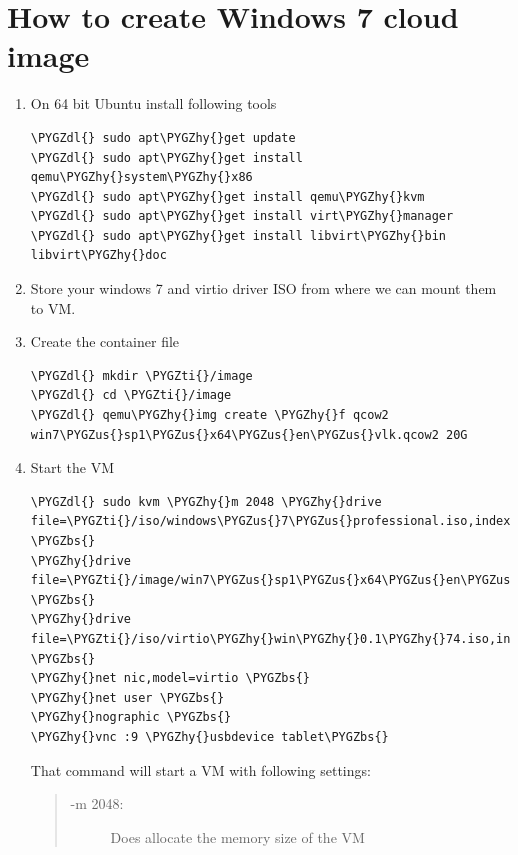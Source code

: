 \documentclass[letterpaper,10pt,english]{sphinxmanual}
\def\PYGZbs{\char`\\}
\def\PYGZus{\char`\_}
\def\PYGZdl{\char`\$}
\def\PYGZhy{\char`\-}
\def\PYGZti{\char`\~}
\begin{document}
\section{How to create Windows 7 cloud image}
\label{_source/admin_guide/windows7_image::doc}\label{_source/admin_guide/windows7_image:how-to-create-windows-7-cloud-image}\begin{enumerate}
\item {} 
On 64 bit Ubuntu install following tools

\begin{Verbatim}[commandchars=\\\{\}]
\PYGZdl{} sudo apt\PYGZhy{}get update
\PYGZdl{} sudo apt\PYGZhy{}get install qemu\PYGZhy{}system\PYGZhy{}x86
\PYGZdl{} sudo apt\PYGZhy{}get install qemu\PYGZhy{}kvm
\PYGZdl{} sudo apt\PYGZhy{}get install virt\PYGZhy{}manager
\PYGZdl{} sudo apt\PYGZhy{}get install libvirt\PYGZhy{}bin libvirt\PYGZhy{}doc
\end{Verbatim}

\item {} 
Store your windows 7 and virtio driver ISO from where we can mount them to VM.

\item {} 
Create the container file

\begin{Verbatim}[commandchars=\\\{\}]
\PYGZdl{} mkdir \PYGZti{}/image
\PYGZdl{} cd \PYGZti{}/image
\PYGZdl{} qemu\PYGZhy{}img create \PYGZhy{}f qcow2 win7\PYGZus{}sp1\PYGZus{}x64\PYGZus{}en\PYGZus{}vlk.qcow2 20G
\end{Verbatim}

\item {} 
Start the VM

\begin{Verbatim}[commandchars=\\\{\}]
\PYGZdl{} sudo kvm \PYGZhy{}m 2048 \PYGZhy{}drive file=\PYGZti{}/iso/windows\PYGZus{}7\PYGZus{}professional.iso,index=1,media=cdrom \PYGZbs{}
\PYGZhy{}drive file=\PYGZti{}/image/win7\PYGZus{}sp1\PYGZus{}x64\PYGZus{}en\PYGZus{}vlk.qcow2,if=virtio \PYGZbs{}
\PYGZhy{}drive file=\PYGZti{}/iso/virtio\PYGZhy{}win\PYGZhy{}0.1\PYGZhy{}74.iso,index=3,media=cdrom \PYGZbs{}
\PYGZhy{}net nic,model=virtio \PYGZbs{}
\PYGZhy{}net user \PYGZbs{}
\PYGZhy{}nographic \PYGZbs{}
\PYGZhy{}vnc :9 \PYGZhy{}usbdevice tablet\PYGZbs{}
\end{Verbatim}

That command will start a VM with following settings:
\begin{quote}
\begin{description}
\item[{-m 2048:}] \leavevmode
Does allocate the memory size of the VM


\end{description}
\end{quote}
\end{enumerate}
\end{document}
